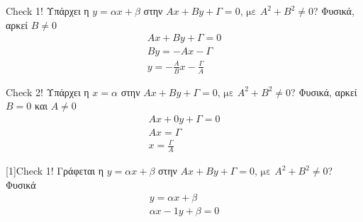 \documentclass[greek]{beamer}
\begin{document}
\begin{frame}{Check 1!}
 Υπάρχει η $y=αx+β$ στην $Αx+Βy+Γ=0 \text{, με } Α^2+Β^2\ne 0$?
  Φυσικά, αρκεί $Β\ne 0$
 \begin{align*}
  Αx+Βy+Γ=0 \\
  Βy=-Αx-Γ  \\
  y=-\frac{Α}{Β}x-\frac{Γ}{Α}
 \end{align*}
\end{frame}

\begin{frame}{Check 2!}
 Υπάρχει η $x=α$ στην $Αx+Βy+Γ=0 \text{, με } Α^2+Β^2\ne 0$?
  Φυσικά, αρκεί $Β=0$ και $Α\ne 0$
 \begin{align*}
  Αx+0y+Γ=0 \\
  Αx=Γ      \\
  x=\frac{Γ}{Α}
 \end{align*}
\end{frame}

\begin{frame}{\scalebox{-1}[1]{Check 1!}}
 Γράφεται η $y=αx+β$ στην $Αx+Βy+Γ=0 \text{, με } Α^2+Β^2\ne 0$?
  Φυσικά
 \begin{align*}
  y=αx+β \\
  αx-1y+β=0
 \end{align*}
\end{frame}
\end{document}
